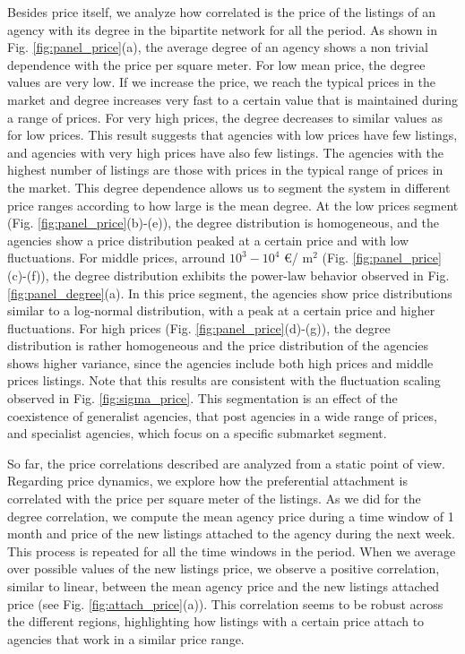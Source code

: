 Besides price itself, we analyze how correlated is the price of the listings of an agency with its degree in the bipartite network for all the period. As shown in Fig. \ref{fig:panel_price}(a), the average degree of an agency shows a non trivial dependence with the price per square meter. For low mean price, the degree values are very low. If we increase the price, we reach the typical prices in the market and degree increases very fast to a certain value that is maintained during a range of prices. For very high prices, the degree decreases to similar values as for low prices. This result suggests that agencies with low prices have few listings, and agencies with very high prices have also few listings. The agencies with the highest number of listings are those with prices in the typical range of prices in the market. This degree dependence allows us to segment the system in different price ranges according to how large is the mean degree. At the low prices segment (Fig. \ref{fig:panel_price}(b)-(e)), the degree distribution is homogeneous, and the agencies show a price distribution peaked at a certain price and with low fluctuations. For middle prices, arround $10^3 - 10^4$ \euro / m$^2$ (Fig. \ref{fig:panel_price}(c)-(f)), the degree distribution exhibits the power-law behavior observed in Fig. \ref{fig:panel_degree}(a). In this price segment, the agencies show price distributions similar to a log-normal distribution, with a peak at a certain price and higher fluctuations. For high prices (Fig. \ref{fig:panel_price}(d)-(g)), the degree distribution is rather homogeneous and the price distribution of the agencies shows higher variance, since the agencies include both high prices and middle prices listings. Note that this results are consistent with the fluctuation scaling observed in Fig. \ref{fig:sigma_price}. This segmentation is an effect of the coexistence of generalist agencies, that post agencies in a wide range of prices, and specialist agencies, which focus on a specific submarket segment.

So far, the price correlations described are analyzed from a static point of view. Regarding price dynamics, we explore how the preferential attachment is correlated with the price per square meter of the listings. As we did for the degree correlation, we compute the mean agency price during a time window of 1 month and price of the new listings attached to the agency during the next week. This process is repeated for all the time windows in the period. When we average over possible values of the new listings price, we observe a positive correlation, similar to linear, between the mean agency price and the new listings attached price (see Fig. \ref{fig:attach_price}(a)). This correlation seems to be robust across the different regions, highlighting how listings with a certain price attach to agencies that work in a similar price range.

